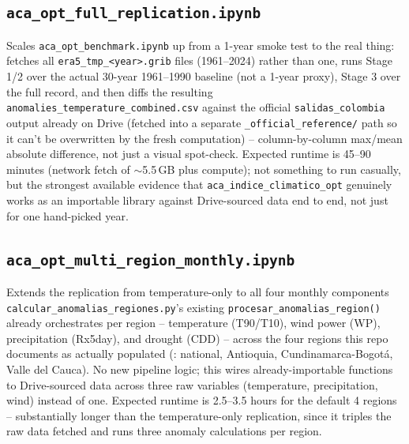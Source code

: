 \documentclass[11pt]{article}
\begin{document}
\subsection{\texttt{aca\_opt\_full\_replication.ipynb}}

Scales \texttt{aca\_opt\_benchmark.ipynb} up from a 1-year smoke test to
the real thing: fetches all \texttt{era5\_tmp\_<year>.grib} files
(1961--2024) rather than one, runs Stage 1/2 over the actual 30-year
1961--1990 baseline (not a 1-year proxy), Stage 3 over the full record,
and then diffs the resulting \texttt{anomalies\_temperature\_combined.csv}
against the official \texttt{salidas\_colombia} output already on Drive
(fetched into a separate \texttt{\_official\_reference/} path so it can't
be overwritten by the fresh computation) -- column-by-column max/mean
absolute difference, not just a visual spot-check. Expected runtime is
45--90 minutes (network fetch of $\sim$5.5\,GB plus compute); not
something to run casually, but the strongest available evidence that
\texttt{aca\_indice\_climatico\_opt} genuinely works as an importable
library against Drive-sourced data end to end, not just for one
hand-picked year.

\subsection{\texttt{aca\_opt\_multi\_region\_monthly.ipynb}}

Extends the replication from temperature-only to all four monthly
components \texttt{calcular\_anomalias\_regiones.py}'s existing
\texttt{procesar\_anomalias\_region()} already orchestrates per region --
temperature (T90/T10), wind power (WP), precipitation (Rx5day), and
drought (CDD) -- across the four regions this repo documents as actually
populated (: national, Antioquia,
Cundinamarca-Bogot\'a, Valle del Cauca). No new pipeline logic; this wires
already-importable functions to Drive-sourced data across three raw
variables (temperature, precipitation, wind) instead of one. Expected
runtime is 2.5--3.5 hours for the default 4 regions -- substantially
longer than the temperature-only replication, since it triples the raw
data fetched and runs three anomaly calculations per region.
\end{document}
